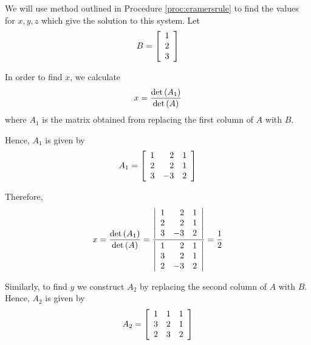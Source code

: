 \begin{solution} We will use method outlined in Procedure \ref{proc:cramersrule} to find the values for
$x,y,z$ which give the solution to this system. 
Let
\begin{equation*}
B = 
\left[ 
\begin{array}{r}
1 \\
2 \\
3
\end{array}
\right] 
\end{equation*}

In order to find $x$, we calculate
\begin{equation*}
x =
\vspace{0.05in}\frac{\det \left(A_{1}\right)}{\det \left(A\right)}
\end{equation*}
where $A_1$ is the matrix obtained from replacing the first column of $A$ with $B$.

Hence, $A_1$ is given by 
\begin{equation*}
A_1 = 
\left[
\begin{array}{rrr}
1 & 2 & 1 \\
2 & 2 & 1 \\
3 & -3 & 2
\end{array}
\right]
\end{equation*}

Therefore,
\begin{equation*}
x=
\vspace{0.05in}\frac{\det \left(A_{1}\right)}{\det \left(A\right)}
=
\vspace{0.05in}\frac{\left|
\begin{array}{rrr}
1 &  2 & 1 \\
2 &  2 & 1 \\
3 & -3 & 2
\end{array}
\right| }{\left|
\begin{array}{rrr}
1 & 2 & 1 \\
3 & 2 & 1 \\
2 & -3 & 2
\end{array}
\right| }=\vspace{0.05in}\frac{1}{2}
\end{equation*}

Similarly, to find $y$ we construct $A_2$ by replacing the second column of $A$ with $B$. Hence, $A_2$ is given by
\begin{equation*}
A_2
=
\left[
\begin{array}{rrr}
1 & 1 & 1 \\
3 & 2 & 1 \\
2 & 3 & 2
\end{array}
\right]
\end{equation*}


\end{solution}
